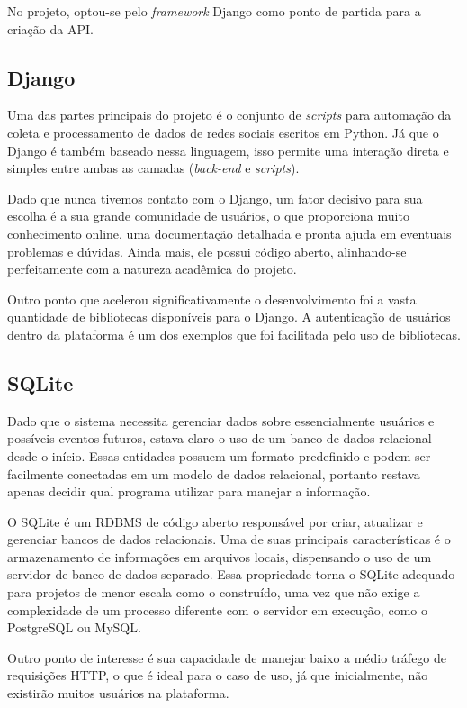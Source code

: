 No projeto, optou-se pelo \textit{framework} Django como ponto de partida para
a criação da \acs{API}.

\subsection{Django}

Uma das partes principais do projeto é o conjunto de \textit{scripts} para
automação da coleta e processamento de dados de redes sociais escritos em
Python. Já que o Django é também baseado nessa linguagem, isso permite uma
interação direta e simples entre ambas as camadas (\textit{back-end} e
\textit{scripts}).

Dado que nunca tivemos contato com o Django, um fator decisivo para sua escolha
é a sua grande comunidade de usuários, o que proporciona muito conhecimento
online, uma documentação detalhada e pronta ajuda em eventuais problemas e
dúvidas. Ainda mais, ele possui código aberto, alinhando-se perfeitamente com a
natureza acadêmica do projeto.

Outro ponto que acelerou significativamente o desenvolvimento foi a vasta
quantidade de bibliotecas disponíveis para o Django. A autenticação de usuários
dentro da plataforma é um dos exemplos que foi facilitada pelo uso de
bibliotecas.

\subsection{SQLite}

Dado que o sistema necessita gerenciar dados sobre essencialmente usuários e
possíveis eventos futuros, estava claro o uso de um banco de dados relacional
desde o início. Essas entidades possuem um formato predefinido e podem ser
facilmente conectadas em um modelo de dados relacional, portanto restava apenas
decidir qual programa utilizar para manejar a informação.

O SQLite é um \ac{RDBMS} de código aberto responsável por criar, atualizar e
gerenciar bancos de dados relacionais. Uma de suas principais características é
o armazenamento de informações em arquivos locais, dispensando o uso de um
servidor de banco de dados separado. Essa propriedade torna o SQLite adequado
para projetos de menor escala como o construído, uma vez que não exige a
complexidade de um processo diferente com o servidor em execução, como o
PostgreSQL ou MySQL.

Outro ponto de interesse é sua capacidade de manejar baixo a médio tráfego de
requisições \acs{HTTP}\label{acro:HTTP}, o que é ideal para o caso de uso, já
que inicialmente, não existirão muitos usuários na plataforma.

